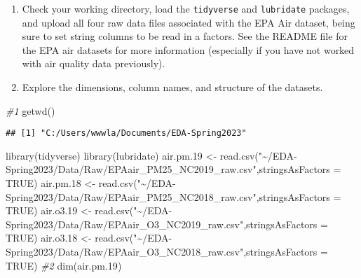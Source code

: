 \documentclass[
]{article}
\newenvironment{Shaded}{\begin{snugshade}}{\end{snugshade}}
\newcommand{\AttributeTok}[1]{\textcolor[rgb]{0.77,0.63,0.00}{#1}}
\newcommand{\CommentTok}[1]{\textcolor[rgb]{0.56,0.35,0.01}{\textit{#1}}}
\newcommand{\ConstantTok}[1]{\textcolor[rgb]{0.00,0.00,0.00}{#1}}
\newcommand{\FloatTok}[1]{\textcolor[rgb]{0.00,0.00,0.81}{#1}}
\newcommand{\FunctionTok}[1]{\textcolor[rgb]{0.00,0.00,0.00}{#1}}
\newcommand{\NormalTok}[1]{#1}
\newcommand{\OtherTok}[1]{\textcolor[rgb]{0.56,0.35,0.01}{#1}}
\newcommand{\StringTok}[1]{\textcolor[rgb]{0.31,0.60,0.02}{#1}}
\begin{document}
\begin{enumerate}
\def\labelenumi{\arabic{enumi}.}
\item
  Check your working directory, load the \texttt{tidyverse} and
  \texttt{lubridate} packages, and upload all four raw data files
  associated with the EPA Air dataset, being sure to set string columns
  to be read in a factors. See the README file for the EPA air datasets
  for more information (especially if you have not worked with air
  quality data previously).
\item
  Explore the dimensions, column names, and structure of the datasets.
\end{enumerate}

\begin{Shaded}
\begin{Highlighting}[]
\CommentTok{\#1}
\FunctionTok{getwd}\NormalTok{()}
\end{Highlighting}
\end{Shaded}

\begin{verbatim}
## [1] "C:/Users/wwwla/Documents/EDA-Spring2023"
\end{verbatim}

\begin{Shaded}
\begin{Highlighting}[]
\FunctionTok{library}\NormalTok{(tidyverse)}
\FunctionTok{library}\NormalTok{(lubridate)}
\NormalTok{air.pm}\FloatTok{.19} \OtherTok{\textless{}{-}} \FunctionTok{read.csv}\NormalTok{(}\StringTok{"\textasciitilde{}/EDA{-}Spring2023/Data/Raw/EPAair\_PM25\_NC2019\_raw.csv"}\NormalTok{,}\AttributeTok{stringsAsFactors =} \ConstantTok{TRUE}\NormalTok{)}
\NormalTok{air.pm}\FloatTok{.18} \OtherTok{\textless{}{-}} \FunctionTok{read.csv}\NormalTok{(}\StringTok{"\textasciitilde{}/EDA{-}Spring2023/Data/Raw/EPAair\_PM25\_NC2018\_raw.csv"}\NormalTok{,}\AttributeTok{stringsAsFactors =} \ConstantTok{TRUE}\NormalTok{)}
\NormalTok{air.o3}\FloatTok{.19} \OtherTok{\textless{}{-}} \FunctionTok{read.csv}\NormalTok{(}\StringTok{"\textasciitilde{}/EDA{-}Spring2023/Data/Raw/EPAair\_O3\_NC2019\_raw.csv"}\NormalTok{,}\AttributeTok{stringsAsFactors =} \ConstantTok{TRUE}\NormalTok{)}
\NormalTok{air.o3}\FloatTok{.18} \OtherTok{\textless{}{-}} \FunctionTok{read.csv}\NormalTok{(}\StringTok{"\textasciitilde{}/EDA{-}Spring2023/Data/Raw/EPAair\_O3\_NC2018\_raw.csv"}\NormalTok{,}\AttributeTok{stringsAsFactors =} \ConstantTok{TRUE}\NormalTok{)}
\CommentTok{\#2}
\FunctionTok{dim}\NormalTok{(air.pm}\FloatTok{.19}\NormalTok{)}
\end{Highlighting}
\end{Shaded}
\end{document}

